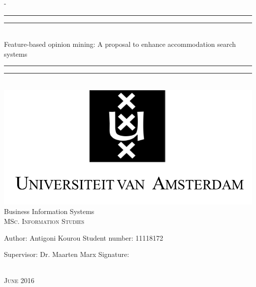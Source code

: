 %
% 
%
%
%
\begin{titlingpage}
\begin{SingleSpace}
\calccentering{\unitlength} 
\begin{adjustwidth*}{\unitlength}{-\unitlength}
\vspace*{13mm}
\begin{center}
\rule[0.5ex]{\linewidth}{2pt}\vspace*{-\baselineskip}\vspace*{3.2pt}
\rule[0.5ex]{\linewidth}{1pt}\\[\baselineskip]
{\huge Feature-based opinion mining: A proposal to enhance accommodation search systems}\\[4mm]
\rule[0.5ex]{\linewidth}{1pt}\vspace*{-\baselineskip}\vspace{3.2pt}
\rule[0.5ex]{\linewidth}{2pt}\\
\vspace{6.5mm}
\vspace{13mm}
\includegraphics[scale=0.6]{logos/UvA}\\
\vspace{4mm}
{\large Business Information Systems\\
\textsc{MSc. Information Studies}}\\
\vspace{4cm}
\begin{minipage}{13cm}
{\large Author: Antigoni Kourou \hspace{33.2mm} Student number: 11118172

Supervisor: Dr. Maarten Marx \hspace{24mm} Signature:} 
\end{minipage}\\
\vspace{30mm}
{\large\textsc{June 2016}}
\end{center}
\end{adjustwidth*}
\end{SingleSpace}
\end{titlingpage}
\clearemptydoublepage 